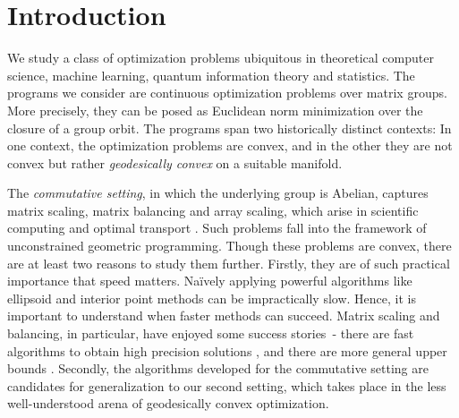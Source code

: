 \section{Introduction}
We study a class of optimization problems ubiquitous in theoretical computer science, machine learning,  quantum information theory and statistics. The programs we consider are continuous optimization problems over matrix groups. More precisely, they can be posed as Euclidean norm minimization over the closure of a group orbit. The programs span two historically distinct contexts: In one context, the optimization problems are convex, and in the other they are not convex but rather \emph{geodesically convex} on a suitable manifold.


The \emph{commutative setting}, in which the underlying group is Abelian, captures matrix scaling, matrix balancing and array scaling, which arise in scientific computing and optimal transport \cite{cuturi2013sinkhorn, parlett1971balancing}. Such problems fall into the framework of unconstrained geometric programming. Though these problems are convex, there are at least two reasons to study them further. Firstly, they are of such practical importance that speed matters. Na\"ively applying powerful algorithms like ellipsoid and interior point methods can be impractically slow. Hence, it is important to understand when faster methods can succeed. Matrix scaling and balancing, in particular, have enjoyed some success stories~- there are fast algorithms to obtain high precision solutions \cite{cohen2017matrix,allen2017much}, and there are more general upper bounds \cite{burgisser2020interior}. Secondly, the algorithms developed for the commutative setting are candidates for generalization to our second setting, which takes place in the less well-understood arena of geodesically convex optimization.


